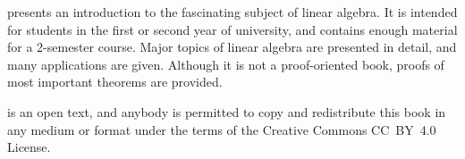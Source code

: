 
\textit{\bookfulltitle} presents an introduction to the fascinating
subject of linear algebra. It is intended for students in the first or
second year of university, and contains enough material for a
2-semester course. Major topics of linear algebra are presented in
detail, and many applications are given. Although it is not a
proof-oriented book, proofs of most important theorems are
provided. 

\textit{\bookfulltitle} is an open text, and anybody is permitted to
copy and redistribute this book in any medium or format under the
terms of the Creative Commons CC~BY~4.0 License.
